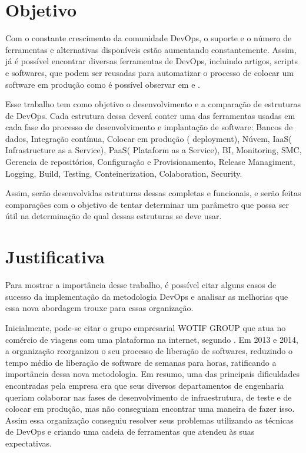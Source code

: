 \section{Objetivo}

Com o constante crescimento da comunidade DevOps, o suporte 
e o número de ferramentas e alternativas disponíveis estão 
aumentando constantemente. Assim, já é possível encontrar 
diversas ferramentas de DevOps, incluindo artigos, scripts 
e softwares, que podem ser reusadas para 
automatizar o processo de colocar um software em produção 
como é possível observar em \cite{nelson2013test} e 
\cite{sabharwal2014automation}. 

Esse trabalho tem como objetivo o desenvolvimento e a 
comparação de estruturas de DevOps. Cada estrutura dessa 
deverá conter uma das ferramentas usadas em cada fase do 
processo de desenvolvimento e implantação de software: 
Bancos de dados, Integração contínua, Colocar em produção
( deployment), Núvem, IaaS( Infrastructure as a Service),
PaaS( Plataform as a Service), BI, Monitoring, SMC, 
Gerencia de repositórios, Configuração e Provisionamento, 
Release Managiment, Logging, Build, Testing, Conteinerization, 
Colaboration, Security.

Assim, serão desenvolvidas estruturas dessas completas e 
funcionais, e serão feitas comparações com o objetivo de 
tentar determinar um parâmetro que possa ser útil na 
determinação de qual dessas estruturas se deve usar.

\section{Justificativa}

Para mostrar a importância desse trabalho, é possível citar 
alguns casos de sucesso da implementação da metodologia DevOps 
e analisar as melhorias que essa nova abordagem trouxe 
para essas organização.

Inicialmente, pode-se citar o grupo empresarial WOTIF GROUP que 
atua no comércio de viagens com uma plataforma na internet, 
segundo \cite{callanandevops}. Em 2013 e 2014, a organização 
reorganizou o seu processo de liberação de softwares, reduzindo 
o tempo médio de liberação de software de semanas para horas, 
ratificando a importância dessa nova metodologia. Em resumo, 
uma das principais dificuldades encontradas pela empresa era 
que seus diversos departamentos de engenharia queriam colaborar 
nas fases de desenvolvimento de infraestrutura, de teste e de 
colocar em produção, mas não conseguiam encontrar uma maneira 
de fazer isso. Assim essa organização conseguiu resolver seus 
problemas utilizando as técnicas de DevOps e criando uma cadeia 
de ferramentas que atendeu às suas expectativas.


